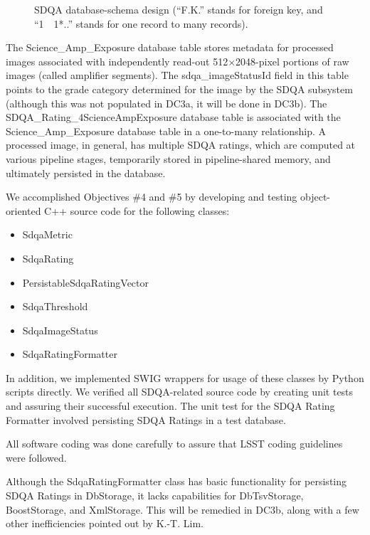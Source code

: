 \begin{figure}
\caption{SDQA database-schema design (``F.K.'' stands for foreign key, and ``1~{\jot 24pt}~1*..'' stands for one record to many records).} 
 \label{DB}
\end{figure}

The Science\_Amp\_Exposure database table stores metadata for
processed images associated with independently read-out 
512$\times$2048-pixel portions of 
raw images (called amplifier 
segments).  The sdqa\_imageStatusId field in this table points to the grade
category determined for the image by the SDQA subsystem (although this was not populated
in DC3a, it will be done in DC3b).  
The SDQA\_Rating\_4ScienceAmpExposure database table is associated with 
the Science\_Amp\_Exposure database table in a one-to-many
relationship.  A processed image, in general, has multiple SDQA ratings, which
are computed at various pipeline stages, temporarily stored in pipeline-shared memory, and 
ultimately persisted in the database.


We accomplished Objectives \#4 and \#5 by developing and testing object-oriented C++
source code for the following classes:

\begin{itemize}
\item{SdqaMetric}
\item{SdqaRating}
\item{PersistableSdqaRatingVector}
\item{SdqaThreshold}
\item{SdqaImageStatus}
\item{SdqaRatingFormatter}
\end{itemize}

\noindent
In addition, we implemented SWIG wrappers for usage of these classes by Python scripts
directly.  We verified all SDQA-related source code by creating unit tests and assuring
their successful execution.  The unit test for the SDQA Rating Formatter involved 
persisting SDQA Ratings in a test database.  

All software coding was done carefully to assure that LSST coding guidelines were followed.

Although the SdqaRatingFormatter class has basic functionality for persisting SDQA Ratings
in DbStorage, it lacks capabilities for DbTsvStorage, BoostStorage, and XmlStorage.  This
will be remedied in DC3b, along with a few other inefficiencies pointed out by K.-T. Lim.

